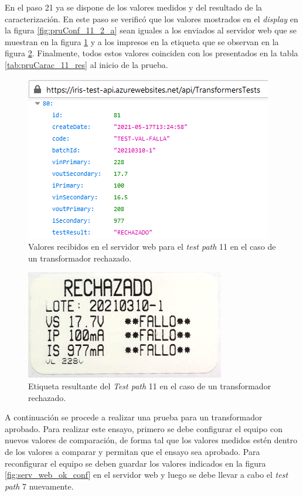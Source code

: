 En el paso 21 ya se dispone de los valores medidos y del resultado de la caracterización. En este paso se verificó que los valores mostrados en el \textit{display} en la figura \ref{fig:pruConf_11_2_a} sean iguales a los enviados al servidor web que se muestran en la figura \ref{fig:serv_web_falla_resul} y a los impresos en la etiqueta que se observan en la figura \ref{fig:etiqueta_falla}. Finalmente, todos estos valores coinciden con los presentados en la tabla \ref{tab:pruCarac_11_res} al inicio de la prueba.

\pagebreak

\begin{figure}[htpb]
	\centering
	\includegraphics[scale=0.9]{./Figures/serv_web_falla_resul.png}
	\caption{Valores recibidos en el servidor web para el \textit{test path} 11 en el caso de un transformador rechazado.}
	\label{fig:serv_web_falla_resul}
\end{figure}

\begin{figure}[htpb]
	\centering
	\includegraphics[scale=0.7]{./Figures/etiqueta_falla.png}
	\caption{Etiqueta resultante del \textit{Test path} 11 en el caso de un transformador rechazado.}
	\label{fig:etiqueta_falla}
\end{figure}

A continuación se procede a realizar una prueba para un transformador aprobado. Para realizar este ensayo, primero se debe configurar el equipo con nuevos valores de comparación, de forma tal que los valores medidos estén dentro de los valores a comparar y permitan que el ensayo sea aprobado. Para reconfigurar el equipo se deben guardar los valores indicados en la figura \ref{fig:serv_web_ok_conf} en el servidor web y luego se debe llevar a cabo el \textit{test path} 7 nuevamente.

